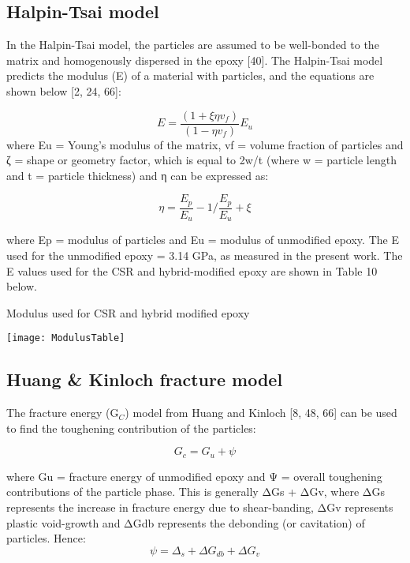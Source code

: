 \documentclass[numbers=noendperiod,chapterprefix=on]{icldt} %
\begin{document}
\subsection{Halpin-Tsai model}
In the Halpin-Tsai model, the particles are assumed to be well-bonded to the matrix and homogenously dispersed in the epoxy [40]. The Halpin-Tsai model predicts the modulus (E) of a material with particles, and the equations are shown below [2, 24, 66]:

\begin{equation} 
E=\frac{(1+\xi \eta v_f)}{(1-\eta v_f )} E_u
\end{equation}
where Eu = Young’s modulus of the matrix, vf = volume fraction of particles and ζ = shape or geometry factor, which is equal to 2w/t (where w = particle length and t = particle thickness) and η can be expressed as:

\begin{equation} 
\eta=\frac{E_p}{E_u} -1/\frac{E_p}{E_u }+\xi
\end{equation}

where Ep = modulus of particles and Eu = modulus of unmodified epoxy. 
The E used for the unmodified epoxy = 3.14 GPa, as measured in the present work. The E values used for the CSR and hybrid-modified epoxy are shown in Table 10 below. 

\begin{table}[!htpb]
\centering
\caption{Modulus used for CSR and hybrid modified epoxy } %
\texttt{[image: ModulusTable]}
\end{table}
\FloatBarrier

\subsection{Huang \& Kinloch fracture model}
The fracture energy (G$_C$) model from Huang and Kinloch [8, 48, 66] can be used to find the toughening contribution of the particles:

\begin{equation} 
G_c= G_u+\psi
\end{equation}

where Gu = fracture energy of unmodified epoxy and Ψ = overall toughening contributions of the particle phase. This is generally ΔGs + ΔGv, where ΔGs represents the increase in fracture energy due to shear-banding, ΔGv represents plastic void-growth and ΔGdb represents the debonding (or cavitation) of particles. Hence:
\begin{equation} 
\psi=\Delta_s+\Delta G_{db}+\Delta G_v
\end{equation}
\end{document}
